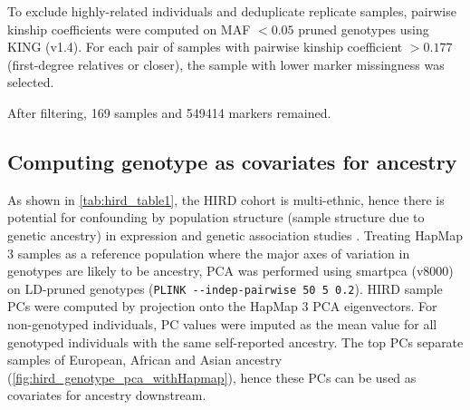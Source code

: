 To exclude highly-related individuals and deduplicate replicate samples, pairwise kinship coefficients were computed on \gls{MAF} $< 0.05$ pruned genotypes using KING (v1.4).
For each pair of samples with pairwise kinship coefficient $> 0.177$ (first-degree relatives or closer), the sample with lower marker missingness was selected.

After filtering, 169 samples and 549414 markers remained.

\subsection{Computing genotype  as covariates for ancestry}

As shown in \autoref{tab:hird_table1}, the \gls{HIRD} cohort is multi-ethnic, hence there is potential for confounding by population structure (sample structure due to genetic ancestry) in expression and genetic association studies \autocite{price2006PrincipalComponentsAnalysis,eu-ahsunthornwattana2014ComparisonMethodsAccount,brown2018ExpressionReflectsPopulation}.
Treating HapMap 3 samples as a reference population where the major axes of variation in genotypes are likely to be ancestry, \gls{PCA} was performed using smartpca (v8000) on \gls{LD}-pruned genotypes (\texttt{PLINK -{}-indep-pairwise 50 5 0.2}).
\gls{HIRD} sample \glspl{PC} were computed by projection onto the HapMap 3 \gls{PCA} eigenvectors.
For non-genotyped individuals, \gls{PC} values were imputed as the mean value for all genotyped individuals with the same self-reported ancestry.
The top \glspl{PC} separate samples of European, African and Asian ancestry (\autoref{fig:hird_genotype_pca_withHapmap}), hence these \glspl{PC} can be used as covariates for ancestry downstream.


